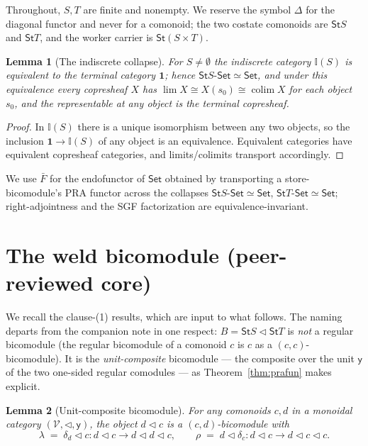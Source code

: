 \documentclass[11pt]{article}
\newcommand{\comp}{\mathbin{\triangleleft}}       %
\newcommand{\Set}{\mathsf{Set}}
\newcommand{\St}{\mathsf{St}}                      %
\newcommand{\I}{\mathbb{I}}                        %
\newcommand{\y}{\mathsf{y}}
\DeclareMathOperator*{\colim}{colim}
\theoremstyle{plain}
\newtheorem{lemma}{Lemma}
\theoremstyle{definition}
\theoremstyle{remark}
\begin{document}
Throughout, $S,T$ are finite and nonempty. We reserve the symbol $\Delta$ for the diagonal
functor and never for a comonoid; the two costate comonoids are $\St S$ and $\St T$, and
the worker carrier is $\St(S\times T)$.

\begin{lemma}[The indiscrete collapse]\label{lem:collapse}
For $S\ne\emptyset$ the indiscrete category $\I(S)$ is equivalent to the terminal category
$\mathbf 1$; hence $\St S\text{-}\Set\simeq\Set$, and under this equivalence every
copresheaf $X$ has $\lim X\cong X(s_0)\cong\colim X$ for each object $s_0$, and the
representable at any object is the terminal copresheaf.
\end{lemma}

\begin{proof}
In $\I(S)$ there is a unique isomorphism between any two objects, so the inclusion
$\mathbf 1\to\I(S)$ of any object is an equivalence. Equivalent categories have equivalent
copresheaf categories, and limits/colimits transport accordingly.
\end{proof}

We use $\bar F$ for the endofunctor of $\Set$ obtained by transporting a store-bicomodule's
PRA functor across the collapses $\St S\text{-}\Set\simeq\Set$,
$\St T\text{-}\Set\simeq\Set$; right-adjointness and the SGF factorization are
equivalence-invariant.

\section{The weld bicomodule (peer-reviewed core)}\label{sec:weld}

We recall the clause-(1) results, which are input to what follows. The naming departs from
the companion note in one respect: $B=\St S\comp\St T$ is \emph{not} a regular bicomodule
(the regular bicomodule of a comonoid $c$ is $c$ as a $(c,c)$-bicomodule). It is the
\emph{unit-composite} bicomodule --- the composite over the unit $\y$ of the two one-sided
regular comodules --- as Theorem~\ref{thm:prafun} makes explicit.

\begin{lemma}[Unit-composite bicomodule]\label{lem:unitcomp}
For any comonoids $c,d$ in a monoidal category $(\mathcal V,\comp,\y)$, the object $d\comp
c$ is a $(c,d)$-bicomodule with
\[
  \lambda \;=\; \delta_d\comp c \colon d\comp c\to d\comp d\comp c,
  \qquad
  \rho \;=\; d\comp\delta_c \colon d\comp c\to d\comp c\comp c .
\]
\end{lemma}
\end{document}
